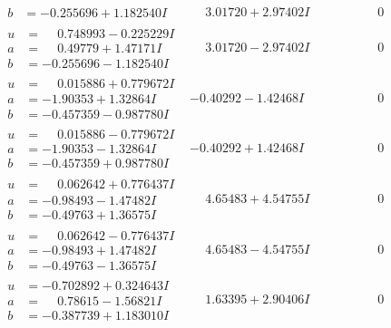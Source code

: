 \documentclass[1p]{elsarticle_modified}
\theoremstyle{definition}
\begin{document}
$$\begin{array}{c|c|c}
\begin{aligned}
b &= -0.255696 + 1.182540 I\end{aligned}
 & \phantom{-}3.01720 + 2.97402 I & \phantom{-0.000000 } 0 \\ \hline\begin{aligned}
u &= \phantom{-}0.748993 - 0.225229 I \\
a &= \phantom{-}0.49779 + 1.47171 I \\
b &= -0.255696 - 1.182540 I\end{aligned}
 & \phantom{-}3.01720 - 2.97402 I & \phantom{-0.000000 } 0 \\ \hline\begin{aligned}
u &= \phantom{-}0.015886 + 0.779672 I \\
a &= -1.90353 + 1.32864 I \\
b &= -0.457359 - 0.987780 I\end{aligned}
 & -0.40292 - 1.42468 I & \phantom{-0.000000 } 0 \\ \hline\begin{aligned}
u &= \phantom{-}0.015886 - 0.779672 I \\
a &= -1.90353 - 1.32864 I \\
b &= -0.457359 + 0.987780 I\end{aligned}
 & -0.40292 + 1.42468 I & \phantom{-0.000000 } 0 \\ \hline\begin{aligned}
u &= \phantom{-}0.062642 + 0.776437 I \\
a &= -0.98493 - 1.47482 I \\
b &= -0.49763 + 1.36575 I\end{aligned}
 & \phantom{-}4.65483 + 4.54755 I & \phantom{-0.000000 } 0 \\ \hline\begin{aligned}
u &= \phantom{-}0.062642 - 0.776437 I \\
a &= -0.98493 + 1.47482 I \\
b &= -0.49763 - 1.36575 I\end{aligned}
 & \phantom{-}4.65483 - 4.54755 I & \phantom{-0.000000 } 0 \\ \hline\begin{aligned}
u &= -0.702892 + 0.324643 I \\
a &= \phantom{-}0.78615 - 1.56821 I \\
b &= -0.387739 + 1.183010 I\end{aligned}
 & \phantom{-}1.63395 + 2.90406 I & \phantom{-0.000000 } 0 \\ \hline\begin{aligned}

\end{aligned}
\end{array}$$
\end{document}
